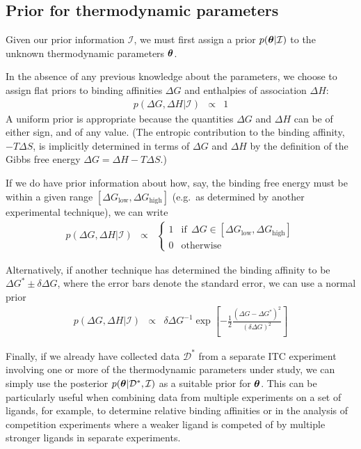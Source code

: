 \documentclass[aps,pre,twocolumn,nofootinbib,superscriptaddress,linenumbers]{revtex4-1}
\newcommand{\bfv}[1]{{\mbox{\boldmath{$#1$}}}}
\begin{document}
\subsection{Prior for thermodynamic parameters}

Given our prior information $\mathcal{I}$, we must first assign a prior $p(\bfv{\theta} | \mathcal{I})$ to the unknown thermodynamic parameters $\bfv{\theta}$.

In the absence of any previous knowledge about the parameters, we choose to assign flat priors to binding affinities $\Delta G$ and enthalpies of association $\Delta H$:
\begin{eqnarray}
p(\Delta G, \Delta H | \mathcal{I}) &\propto& 1
\end{eqnarray}
A uniform prior is appropriate because the quantities $\Delta G$ and $\Delta H$ can be of either sign, and of any value.
(The entropic contribution to the binding affinity, $-T\Delta S$, is implicitly determined in terms of $\Delta G$ and $\Delta H$ by the definition of the Gibbs free energy $\Delta G = \Delta H - T \Delta S$.)

If we do have prior information about how, say, the binding free energy must be within a given range $[\Delta G_\mathrm{low}, \Delta G_\mathrm{high}]$ (e.g.~as determined by another experimental technique), we can write 
\begin{eqnarray}
p(\Delta G, \Delta H | \mathcal{I}) &\propto& \begin{cases}
1 & \mathrm{if} \:\: \Delta G \in [\Delta G_\mathrm{low}, \Delta G_\mathrm{high}] \\
0 & \mathrm{otherwise}
\end{cases}
\end{eqnarray}

Alternatively, if another technique has determined the binding affinity to be $\Delta G^* \pm \delta \Delta G$, where the error bars denote the standard error, we can use a normal prior
\begin{eqnarray}
p(\Delta G, \Delta H | \mathcal{I}) &\propto& \delta \Delta G^{-1} \exp\left[- \frac{1}{2} \frac{(\Delta G - \Delta G^*)^2}{(\delta \Delta G)^2}\right]
\end{eqnarray}

Finally, if we already have collected data $\mathcal{D}^*$ from a separate ITC experiment involving one or more of the thermodynamic parameters under study, we can simply use the posterior $p(\bfv{\theta} | \mathcal{D}^*, \mathcal{I})$ as a suitable prior for $\bfv{\theta}$.
This can be particularly useful when combining data from multiple experiments on a set of ligands, for example, to determine relative binding affinities or in the analysis of competition experiments where a weaker ligand is competed of by multiple stronger ligands in separate experiments.
\end{document}
